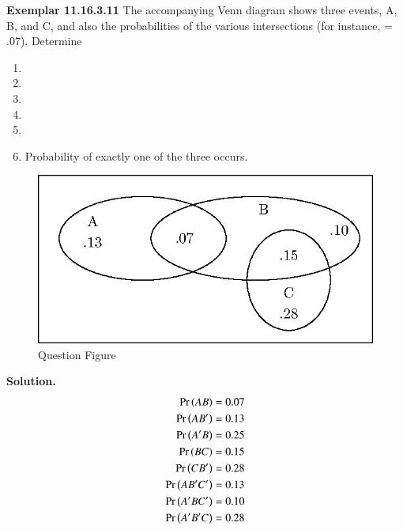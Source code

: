\documentclass[journal,12pt,twocolumn]{IEEEtran}
\begin{document}
\bigskip
\renewcommand{\thefigure}{\theenumi}
\renewcommand{\thetable}{\theenumi}
\textbf{Exemplar 11.16.3.11}
The accompanying Venn diagram shows three events, A, B, and C, and also the probabilities of the various intersections (for instance,  = .07). Determine
\begin{enumerate}[label=(\alph*)]
\item 
{}
\item 
{}
\item 
{}
\item 
{}
\item 
{}
\item 
Probability of exactly one
of the three occurs.
\end{enumerate}
\begin{enumerate}
\begin{figure}[h!]
\includegraphics[width=\columnwidth]{figs/new-figure0}
\caption{Question Figure}
\label{fig}
\end{figure}
\end{enumerate}
\textbf{Solution.}
    \begin{align}
        \label{eq:1}
        \Pr\left(AB\right)=0.07\\
        \label{eq:2}
        \Pr\left(AB^\prime\right)=0.13\\
        \label{eq:8}
        \Pr\left(A^\prime B\right) = 0.25\\
        \label{eq:4}
        \Pr\left(BC\right) = 0.15\\
        \Pr\left(CB^\prime\right) = 0.28\\
        \label{eq:6}
        \Pr\left(AB^\prime C^\prime\right) = 0.13\\
        \label{eq:5}
        \Pr\left(A^\prime B C^\prime\right) =0.10\\
        \label{eq:7}
        \Pr\left(A^\prime B^\prime C\right) =0.28
    \end{align}
\end{document}
